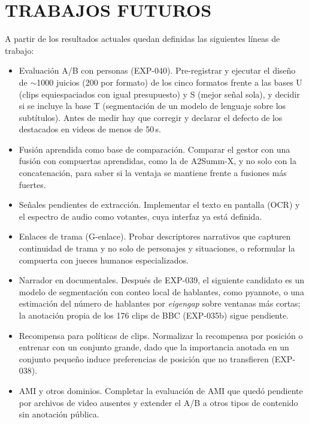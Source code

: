 \chapter*{\center \Large TRABAJOS FUTUROS}

A partir de los resultados actuales quedan definidas las siguientes líneas de trabajo:

\begin{itemize}
  \item Evaluación A/B con personas (EXP-040). Pre-registrar y ejecutar el diseño de
        $\sim$1000 juicios (200 por formato) de los cinco formatos frente a las bases U
        (clips equiespaciados con igual presupuesto) y S (mejor señal sola), y decidir si se
        incluye la base T (segmentación de un modelo de lenguaje sobre los subtítulos). Antes
        de medir hay que corregir y declarar el defecto de los destacados en videos de menos
        de 50\,s.
  \item Fusión aprendida como base de comparación. Comparar el gestor con una fusión con
        compuertas aprendidas, como la de A2Summ-X, y no solo con la concatenación, para
        saber si la ventaja se mantiene frente a fusiones más fuertes.
  \item Señales pendientes de extracción. Implementar el texto en pantalla (OCR) y el
        espectro de audio como votantes, cuya interfaz ya está definida.
  \item Enlaces de trama (G-enlace). Probar descriptores narrativos que capturen continuidad
        de trama y no solo de personajes y situaciones, o reformular la compuerta con jueces
        humanos especializados.
  \item Narrador en documentales. Después de EXP-039, el siguiente candidato es un modelo de
        segmentación con conteo local de hablantes, como pyannote, o una estimación del
        número de hablantes por \emph{eigengap} \cite{park2020nme} sobre ventanas más
        cortas; la anotación propia de los 176 clips de BBC (EXP-035b) sigue pendiente.
  \item Recompensa para políticas de clips. Normalizar la recompensa por posición o
        entrenar con un conjunto grande, dado que la importancia anotada en un conjunto
        pequeño induce preferencias de posición que no transfieren (EXP-038).
  \item AMI y otros dominios. Completar la evaluación de AMI que quedó pendiente por archivos
        de video ausentes y extender el A/B a otros tipos de contenido sin anotación
        pública.
\end{itemize}
